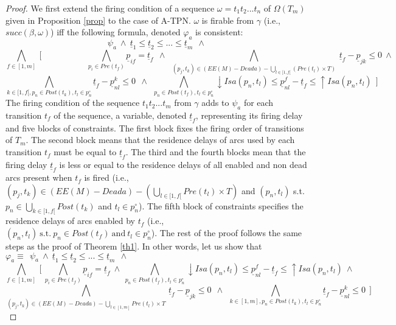 \documentclass[submission,copyright,creativecommons]{eptcs}
\newtheorem{proof}{Proof}
\numberwithin{equation}{section}
\begin{document}
  \begin{proof} We first extend the firing condition of a sequence $\omega=t_1t_2...t_n$ of $\Omega(T_m)$ given in Proposition \ref{prop} to the case of A-TPN. $\omega$ is firable from $\gamma$ (i.e., $succ(\beta,\omega)$) iff the following formula, denoted $\varphi_a$ is consistent:
$$\psi_a \ \wedge \  \underline{t}_1 \leq \underline{t}_2 \leq ... \leq \underline{t}_m \ \ \wedge \ \ $$ $$ \underset{f \in [1,m]} \bigwedge \ [ \ \ \ \ \ \ \ \ \ \ \ \ \ \ \ \ \ \ \ \ \ \ \ \  \underset{p_i \in Pre(t_{f})} \bigwedge  \underline{p}_{if} = \underline{t}_f \ \ \wedge \ \ \underset{(p_j,t_k) \in (EE(M)-Deada) - \underset{l \in [1,f[} \bigcup (Pre(t_{l}) \times T)} \bigwedge   \  \underline{t}_{f} - \underline{p}_{jk} \leq 0  \  \wedge  \  $$
$$ \underset{ k \in[1,f[, p_n \in Post(t_{k}), t_l \in p_n^{\circ} } \bigwedge \underline{t}_{f} - \underline{p}_{nl}^k \leq 0
 \ \ \wedge \ \ \underset{p_n \in Post(t_{f}), t_l \in p_n^{\circ} } \bigwedge {\downarrow Isa(p_{n},t_l)} \leq \underline{p}_{nl}^f - \underline{t}_{f} \leq
{\uparrow Isa(p_{n}, t_l)} \ \ ]$$
The firing condition of the sequence $t_{1} t_{2} ...  t_{m}$ from $\gamma$ adds to $\psi_a$ for each transition  $t_{f}$ of the sequence, a variable, denoted $\underline{t}_f$, representing its firing delay and five blocks of constraints. The first block fixes the firing order of transitions of $T_m$. The second block means that the residence delays of arcs used by each transition $t_{f}$ must be equal to $\underline{t}_f$. The third and the fourth blocks mean that the firing delay $\underline{t}_f$ is less or equal to the residence delays of all enabled and non dead arcs present when $t_{f}$ is fired (i.e., $(p_j,t_k) \in (EE(M) - Deada) - (\underset{l \in [1,f[} \bigcup Pre(t_{l}) \times T)$ and $(p_n,t_l)$ s.t. $p_n \in \underset{k \in [1,f[} \bigcup  Post(t_{k})$ and $t_l \in p_n^\circ $). The fifth block of constraints specifies the residence delays of arcs enabled by $t_{f}$ (i.e., $(p_n,t_l) \ \text{s.t.} \ p_n \in Post(t_f) \ \text{and} \ t_l \in p_n^\circ $). The rest of the proof follows the same steps as the proof of Theorem \ref{th1}. In other words, let us show that $\varphi_a \equiv  \ \ \psi_a \ \wedge \ \underline{t}_1 \leq \underline{t}_2 \leq ... \leq \underline{t}_m \ \ \wedge \ \ $ $$ \underset{f \in [1,m]} \bigwedge \ [ \ \underset{p_i \in Pre(t_{f})} \bigwedge  \underline{p}_{if} = \underline{t}_f \ \wedge \ \underset{p_n \in Post(t_{f}), t_l \in p_n^\circ } \bigwedge {\downarrow Isa(p_{n},t_l)} \leq \underline{p}_{nl}^f - \underline{t}_{f} \leq
{\uparrow Isa(p_{n},t_l)} \ \wedge $$   $$ \underset{(p_j,t_k) \in (EE(M)-Deada) - \underset{l \in [1,m]} \bigcup Pre(t_{l}) \times T} \bigwedge   \  \underline{t}_{f} - \underline{p}_{jk} \leq 0  \ \  \wedge  \ \ \underset{ k \in[1,m], p_n \in Post(t_{k}), t_l \in p_n^\circ } \bigwedge \underline{t}_{f} - \underline{p}_{nl}^k \leq 0 \ \ ]$$

\end{proof}
\end{document}
